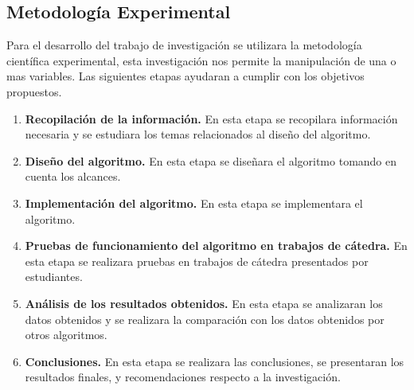 \subsection{Metodología Experimental}
Para el desarrollo del trabajo de investigación se utilizara la metodología científica experimental, esta investigación
nos permite la manipulación de una o mas variables. Las siguientes etapas ayudaran a cumplir con los objetivos propuestos.
\begin{enumerate}
  \item \textbf{Recopilación de la información.} En esta etapa se recopilara información necesaria y se estudiara los temas relacionados al diseño del algoritmo.
  \item \textbf{Diseño del algoritmo.} En esta etapa se diseñara el algoritmo tomando en cuenta los alcances.
  \item \textbf{Implementación del algoritmo.} En esta etapa se implementara el algoritmo.
  \item \textbf{Pruebas de funcionamiento del algoritmo en trabajos de cátedra.} En esta etapa se realizara pruebas en trabajos de cátedra presentados por estudiantes.
  \item \textbf{Análisis de los resultados obtenidos.} En esta etapa se analizaran los datos obtenidos y se realizara la comparación con los datos obtenidos por otros algoritmos.
  \item \textbf{Conclusiones.} En esta etapa se realizara las conclusiones, se presentaran los resultados finales, y recomendaciones respecto a la investigación.
\end{enumerate}
